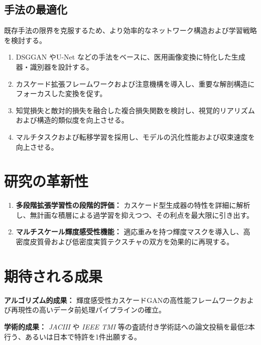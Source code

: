 \documentclass[twocolumn]{article}
\begin{document}
\subsection{手法の最適化}
既存手法の限界を克服するため、より効率的なネットワーク構造および学習戦略を検討する。
\begin{enumerate}
	\item DSGGAN\cite{wang_dsg-gandual-stage-generator-based_2024} やU-Net\cite{navab_u-net_2015} などの手法をベースに、医用画像変換に特化した生成器・識別器を設計する。
	\item カスケード拡張フレームワークおよび注意機構を導入し、重要な解剖構造にフォーカスした変換を促す。
	\item 知覚損失と敵対的損失を融合した複合損失関数を検討し、視覚的リアリズムおよび構造的類似度を向上させる。
	\item マルチタスクおよび転移学習を採用し、モデルの汎化性能および収束速度を向上させる。
\end{enumerate}

\section{研究の革新性}
\begin{enumerate}
	\item \textbf{多段階拡張学習性の段階的評価：} カスケード型生成器の特性を詳細に解析し、無計画な積層による過学習を抑えつつ、その利点を最大限に引き出す。
	\item \textbf{マルチスケール輝度感受性機能：} 適応重みを持つ輝度マスクを導入し、高密度皮質骨および低密度実質テクスチャの双方を効果的に再現する。
\end{enumerate}

\section{期待される成果}
\textbf{アルゴリズム的成果：} 輝度感受性カスケードGANの高性能フレームワークおよび再現性の高いデータ前処理パイプラインの確立。

\textbf{学術的成果：} \emph{JACIII} や \emph{IEEE TMI} 等の査読付き学術誌への論文投稿を最低2本行う、あるいは日本で特許を1件出願する。








\end{document}
